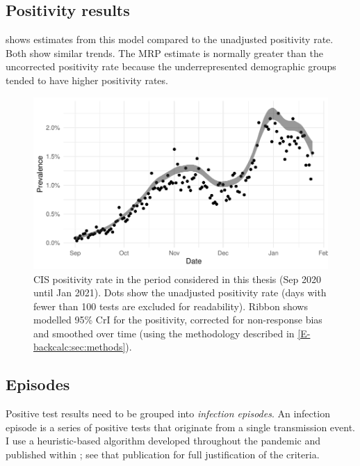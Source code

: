 \documentclass[thesis.tex]{subfiles}
\begin{document}
\subsection{Positivity results} \label{biology-data:sec:positivity-results}

 shows estimates from this model compared to the unadjusted positivity rate.
Both show similar trends.
The MRP estimate is normally greater than the uncorrected positivity rate because the underrepresented demographic groups tended to have higher positivity rates.

\begin{figure}
  \centering \includegraphics[width=\textwidth]{biology-data/CIS-positivity}
  \caption[CIS positivity]{%
    CIS positivity rate in the period considered in this thesis (Sep 2020 until Jan 2021).
    Dots show the unadjusted positivity rate (days with fewer than 100 tests are excluded for readability).
    Ribbon shows modelled 95\% CrI for the positivity, corrected for non-response bias and smoothed over time (using the methodology described in \cref{E-backcalc:sec:methods}).
  }
  \label{biology-data:fig:CIS-positivity}
\end{figure}


\subsection{Episodes} \label{biology-data:sec:cis-episodes}

Positive test results need to be grouped into \emph{infection episodes}.
An infection episode is a series of positive tests that originate from a single transmission event.
I use a heuristic-based algorithm developed throughout the pandemic and published within \textcite{weiRisk}; see that publication for full justification of the criteria.
\end{document}
